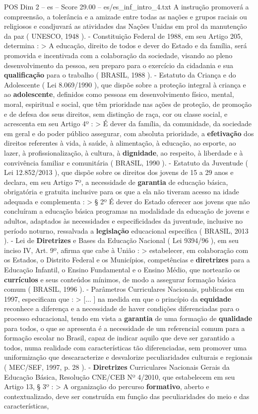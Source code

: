 \begin{textsample}{POS Dim 2 – es – Score 29.00 – es/es\_inf\_intro\_4.txt}
A instrução promoverá a compreensão, a tolerância e a amizade entre todas as nações e grupos raciais ou religiosos e coadjuvará as atividades das Nações Unidas em prol da manutenção da paz ( UNESCO, 1948 ). - Constituição Federal de 1988, em seu Artigo 205, determina : > A educação, direito de todos e dever do Estado e da família, será promovida e incentivada com a colaboração da sociedade, visando ao pleno desenvolvimento da pessoa, seu preparo para o exercício da cidadania e sua \textbf{qualificação} para o trabalho ( BRASIL, 1988 ). - Estatuto da Criança e do Adolescente ( Lei 8.069/1990 ), que dispõe sobre a proteção integral à criança e ao \textbf{adolescente}, definidos como pessoas em desenvolvimento físico, mental, moral, espiritual e social, que têm prioridade nas ações de proteção, de promoção e de defesa dos seus direitos, sem distinção de raça, cor ou classe social, e acrescenta em seu Artigo 4º : > É dever da família, da comunidade, da sociedade em geral e do poder público assegurar, com absoluta prioridade, a \textbf{efetivação} dos direitos referentes à vida, à saúde, à alimentação, à educação, ao esporte, ao lazer, à profissionalização, à cultura, à \textbf{dignidade}, ao respeito, à liberdade e à convivência familiar e comunitária ( BRASIL, 1990 ). - Estatuto da Juventude ( Lei 12.852/2013 ), que dispõe sobre os direitos dos jovens de 15 a 29 anos e declara, em seu Artigo 7º, a necessidade de \textbf{garantia} de educação básica, obrigatória e gratuita inclusive para os que a ela não tiveram acesso na idade adequada e complementa : > § 2º É dever do Estado oferecer aos jovens que não concluíram a educação básica programas na modalidade da educação de jovens e adultos, adaptados às necessidades e especificidades da juventude, inclusive no período noturno, ressalvada a \textbf{legislação} educacional específica ( BRASIL, 2013 ). - Lei de \textbf{Diretrizes} e Bases da Educação Nacional ( Lei 9394/96 ), em seu inciso IV, Art. 9º, afirma que cabe à União : > estabelecer, em colaboração com os Estados, o Distrito Federal e os Municípios, competências e \textbf{diretrizes} para a Educação Infantil, o Ensino Fundamental e o Ensino Médio, que nortearão os \textbf{currículos} e seus conteúdos mínimos, de modo a assegurar formação básica comum ( BRASIL, 1996 ). - Parâmetros Curriculares Nacionais, publicados em 1997, especificam que : > [... ] na medida em que o princípio da \textbf{equidade} reconhece a diferença e a necessidade de haver condições diferenciadas para o processo educacional, tendo em vista a \textbf{garantia} de uma formação de \textbf{qualidade} para todos, o que se apresenta é a necessidade de um referencial comum para a formação escolar no Brasil, capaz de indicar aquilo que deve ser garantido a todos, numa realidade com características tão diferenciadas, sem promover uma uniformização que descaracterize e desvalorize peculiaridades culturais e regionais ( MEC/SEF, 1997, p. 28 ). - \textbf{Diretrizes} Curriculares Nacionais Gerais da Educação Básica, Resolução CNE/CEB Nº 4/2010, que estabelecem em seu Artigo 13, § 3º : > A organização do percurso \textbf{formativo}, aberto e contextualizado, deve ser construída em função das peculiaridades do meio e das características, 
\end{textsample}

